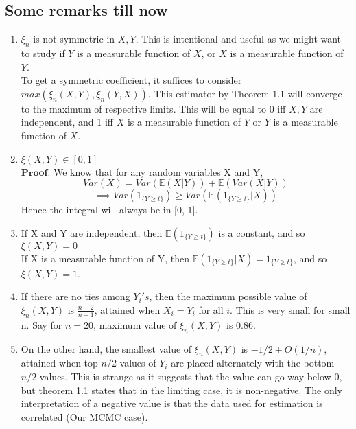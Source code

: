 \subsection{Some remarks till now}
\begin{enumerate}
    \item $\xi_n$ is not symmetric in $X, Y$. This is intentional and useful as we might want to study if $Y$ is a measurable function of $X$, or $X$ is a measurable function of $Y$. \\ To get a symmetric coefficient, it suffices to consider $max(\xi_n(X, Y), \xi_n(Y, X))$. This estimator by Theorem 1.1 will converge to the maximum of respective limits. This will be equal to 0 iff $X, Y$ are independent, and 1 iff $X$ is a measurable function of $Y$ or $Y$ is a measurable function of $X$.
    
    \item $\xi(X, Y) \in [0, 1]$ \\ 
    $\textbf{Proof:}$ We know that for any random variables X and Y, 
    $$Var(X) = Var(\mathbb{E}(X|Y)) + \mathbb{E}(Var(X|Y))$$
    $$\implies Var(1_{\{Y \geq t\}}) \geq Var(\mathbb{E}(1_{\{Y \geq t\}}|X))$$
    Hence the integral will always be in [0, 1].
    
    \item If X and Y are independent, then $\mathbb{E}(1_{\{Y \geq t\}})$ is a constant, and so $\xi(X, Y) = 0$ \\ If X is a measurable function of Y, then $\mathbb{E}(1_{\{Y \geq t\}}|X) = 1_{\{Y \geq t\}}$, and so $\xi(X, Y) = 1$.
    
    \item If there are no ties among $Y_i's$, then the maximum possible value of $\xi_n(X, Y)$ is $\frac{n-2}{n+1}$, attained when $X_i = Y_i$ for all $i$. This is very small for small n. Say for $n=20$, maximum value of $\xi_n(X,Y)$ is 0.86. 
    
    \item On the other hand, the smallest value of $\xi_n(X, Y)$ is $-1/2 + O(1/n)$, attained when top $n/2$ values of $Y_i$ are placed alternately with the bottom $n/2$ values. This is strange as it suggests that the value can go way below 0, but theorem 1.1 states that in the limiting case, it is non-negative. The only interpretation of a negative value is that the data used for estimation is correlated (Our MCMC case).
    
\end{enumerate}


